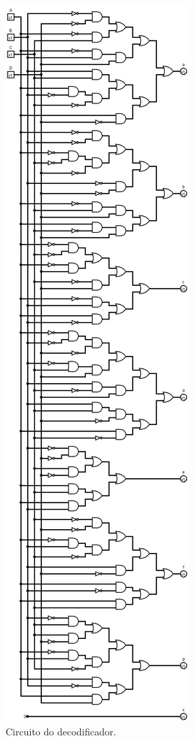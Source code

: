 \documentclass[
	12pt,				%
	openright,			%
	twoside,			%
	a4paper,			%
	english,			%
	french,				%
	spanish,			%
	brazil,				%
	]{abntex2}
\begin{document}
\begin{figure}[H]
	\begin{center}
	    \includegraphics[scale=0.3]{imagens/decode.png}
	\end{center}
\caption{\label{decode}Circuito do decodificador.}
\end{figure}
\end{document}
